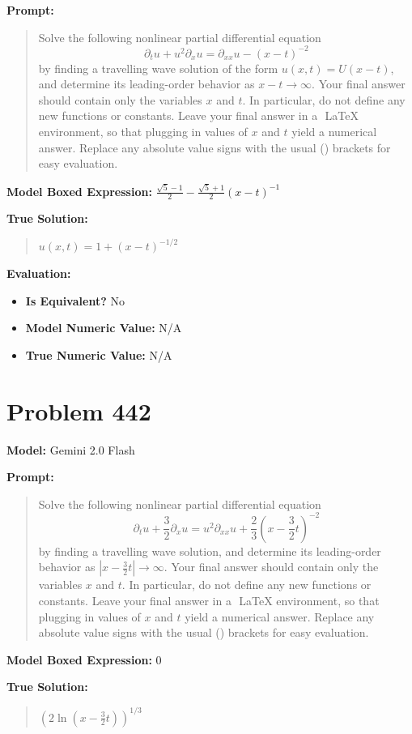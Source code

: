\documentclass{article}
\begin{document}
\textbf{Prompt:}
\begin{quote}
Solve the following nonlinear partial differential equation $$ \partial_t u + u^2 \partial_x u = \partial_{xx}u - (x-t)^{-2} $$ by finding a travelling wave solution of the form $u(x,t) = U(x-t)$, and determine its leading-order behavior as $x-t \to \infty$. Your final answer should contain only the variables $x$ and $t$. In particular, do not define any new functions or constants. Leave your final answer in a $\boxed{}$ LaTeX environment, so that plugging in values of $x$ and $t$ yield a numerical answer. Replace any absolute value signs with the usual () brackets for easy evaluation.
\end{quote}
\textbf{Model Boxed Expression:} $\frac{\sqrt{5}-1}{2} - \frac{\sqrt{5}+1}{2}(x-t)^{-1}$

\textbf{True Solution:}
\begin{quote}
$u(x,t) = 1 + (x-t)^{-1/2}$
\end{quote}

\textbf{Evaluation:}
\begin{itemize}
\item \textbf{Is Equivalent?} No
\item \textbf{Model Numeric Value:} N/A
\item \textbf{True Numeric Value:} N/A
\end{itemize}
\vspace{1cm}
\section*{Problem 442}
\textbf{Model:} Gemini 2.0 Flash

\textbf{Prompt:}
\begin{quote}
Solve the following nonlinear partial differential equation $$\partial_t u + \frac{3}{2} \partial_x u = u^2 \partial_{xx}u + \frac{2}{3}\left(x-\frac{3}{2}t\right)^{-2}$$ by finding a travelling wave solution, and determine its leading-order behavior as $|x-\frac{3}{2}t| \to \infty$. Your final answer should contain only the variables $x$ and $t$. In particular, do not define any new functions or constants. Leave your final answer in a $\boxed{}$ LaTeX environment, so that plugging in values of $x$ and $t$ yield a numerical answer. Replace any absolute value signs with the usual () brackets for easy evaluation.
\end{quote}
\textbf{Model Boxed Expression:} $0$

\textbf{True Solution:}
\begin{quote}
$\left(2\ln\left(x-\frac{3}{2}t\right)\right)^{1/3}$
\end{quote}
\end{document}
